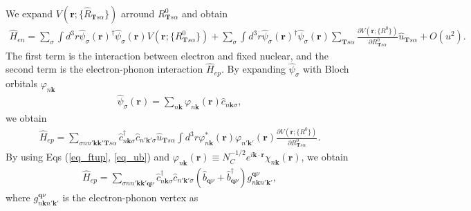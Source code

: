 \documentclass{article}
\begin{document}
We expand $V(\textbf{r};\{\hat{R}_{\textbf{T}s\alpha}\})$ arround $R^0_{\textbf{T}s\alpha}$
and obtain
\begin{align}
    \hat{H}_{en} = \sum_{\sigma} \int d^3 r \hat{\psi}_{\sigma}(\textbf{r})^\dagger 
    \hat{\psi}_{\sigma}(\textbf{r}) V(\textbf{r};\{R^0_{\textbf{T}s\alpha}\})
    +
    \sum_{\sigma} \int d^3 r \hat{\psi}_{\sigma}(\textbf{r})^\dagger 
    \hat{\psi}_{\sigma}(\textbf{r}) \sum_{\textbf{T}s\alpha} 
    \frac{\partial V(\textbf{r};\{R^0\})}{\partial R^0_{\textbf{T}s\alpha}}
    \hat{u}_{\textbf{T}s\alpha}
    +O(u^2).
\end{align}
The first term is the interaction between electron and fixed nuclear, and the second term is the electron-phonon interaction $\hat{H}_{ep}$.
By expanding $\hat{\psi}_{\sigma}$ with Bloch orbitals $\varphi_{n\textbf{k}}$
\begin{align}
    \hat{\psi}_{\sigma}(\textbf{r}) = \sum_{n\textbf{k}}\varphi_{n\textbf{k}}(\textbf{r})
    \hat{c}_{n\textbf{k}\sigma},
\end{align}
we obtain
\begin{align}
    \hat{H}_{ep} = \sum_{\sigma n n' \textbf{k} \textbf{k}' \textbf{T}s\alpha}
    \hat{c}_{n\textbf{k}\sigma}^\dagger \hat{c}_{n'\textbf{k}'\sigma}
    \hat{u}_{\textbf{T}s\alpha}
    \int d^3 r \varphi_{n\textbf{k}}^*(\textbf{r})\varphi_{n'\textbf{k}'}(\textbf{r})
    \frac{\partial V(\textbf{r};\{R^0\})}{\partial R^0_{\textbf{T}s\alpha}}.
\end{align}
By using Eqs (\ref{eq_ftup}, \ref{eq_ub}) and 
$\varphi_{n\textbf{k}}(\textbf{r}) \equiv N^{-1/2}_C e^{i \textbf{k} \cdot \textbf{r}} 
\chi_{n\textbf{k}}(\textbf{r})$, we obtain
\begin{align}
    \hat{H}_{ep} = \sum_{\sigma n n' \textbf{k} \textbf{k}' \textbf{q} \nu}
    \hat{c}_{n\textbf{k}\sigma}^\dagger \hat{c}_{n'\textbf{k}'\sigma}
    (\hat{b}_{\textbf{q}\nu} + \hat{b}_{\textbf{q}\nu}^\dagger)
    g_{n\textbf{k} n'\textbf{k}'}^{\textbf{q}\nu},
\end{align}
where $g_{n\textbf{k} n'\textbf{k}'}^{\textbf{q}\nu}$ is the electron-phonon vertex as
\end{document}

